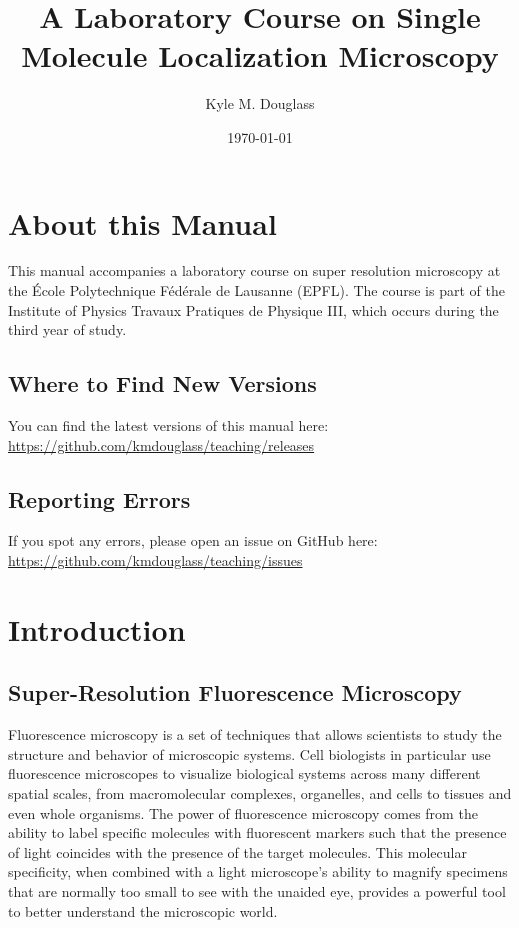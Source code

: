 \documentclass[10pt,a4paper,oneside]{book}
\title{A Laboratory Course on Single Molecule Localization Microscopy}
\author{Kyle M. Douglass}
\date{\today}
\begin{document}
\maketitle

\tableofcontents

\chapter{About this Manual}

This manual accompanies a laboratory course on super resolution microscopy at the École Polytechnique Fédérale de Lausanne (EPFL). The course is part of the Institute of Physics Travaux Pratiques de Physique III, which occurs during the third year of study.

\section{Where to Find New Versions}

You can find the latest versions of this manual here: \url{https://github.com/kmdouglass/teaching/releases}

\section{Reporting Errors}

If you spot any errors, please open an issue on GitHub here: \url{https://github.com/kmdouglass/teaching/issues}

\chapter{Introduction}

\section{Super-Resolution Fluorescence Microscopy}

Fluorescence microscopy is a set of techniques that allows scientists to study the structure and behavior of microscopic systems. Cell biologists in particular use fluorescence microscopes to visualize biological systems across many different spatial scales, from macromolecular complexes, organelles, and cells to tissues and even whole organisms. The power of fluorescence microscopy comes from the ability to label specific molecules with fluorescent markers such that the presence of light coincides with the presence of the target molecules. This molecular specificity, when combined with a light microscope's ability to magnify specimens that are normally too small to see with the unaided eye, provides a powerful tool to better understand the microscopic world.
\end{document}

